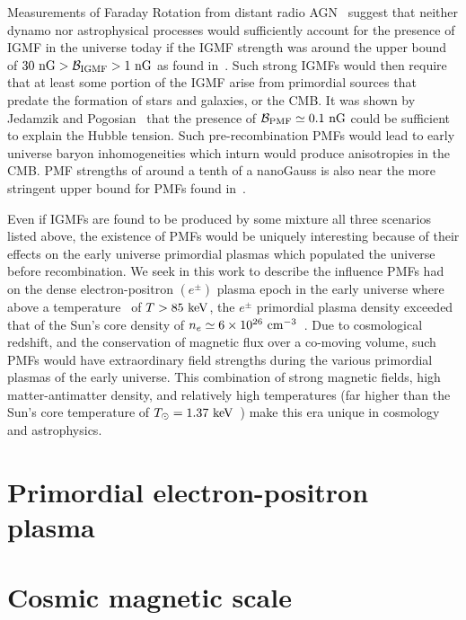 \documentclass[a4paper]{article}
\begin{document}
Measurements of Faraday Rotation from distant radio AGN~\cite{pomakov2022redshift} suggest that neither dynamo nor astrophysical processes would sufficiently account for the presence of IGMF in the universe today if the IGMF strength was around the upper bound of $30{\rm\ nG}>{\cal B}_{\rm IGMF}>1{\rm\ nG}$ as found in~\cite{vernstrom2021discovery}. Such strong IGMFs would then require that at least some portion of the IGMF arise from primordial sources that predate the formation of stars and galaxies, or the CMB. It was shown by Jedamzik and Pogosian~\cite{jedamzik2020relieving} that the presence of ${\cal B}_{\rm PMF}\simeq0.1{\rm\ nG}$ could be sufficient to explain the Hubble tension. Such pre-recombination PMFs would lead to early universe baryon inhomogeneities which inturn would produce anisotropies in the CMB. PMF strengths of around a tenth of a nanoGauss is also near the more stringent upper bound for PMFs found in~\cite{jedamzik2019stringent}.

Even if IGMFs are found to be produced by some mixture all three scenarios listed above, the existence of PMFs would be uniquely interesting because of their effects on the early universe primordial plasmas which populated the universe before recombination. We seek in this work to describe the influence PMFs had on the dense electron-positron $(e^{\pm})$ plasma epoch in the early universe where above a temperature~\cite{rafelski2023short} of $T>85\text{ keV}$, the $e^{\pm}$ primordial plasma density exceeded that of the Sun's core density of $n_{e}\simeq6\times10^{26}{\rm\ cm}^{-3}$~\cite{bahcall2001solar}. Due to cosmological redshift, and the conservation of magnetic flux over a co-moving volume, such PMFs would have extraordinary field strengths during the various primordial plasmas of the early universe. This combination of strong magnetic fields, high matter-antimatter density, and relatively high temperatures (far higher than the Sun's core temperature of $T_{\odot}=1.37\text{ keV}$~\cite{castellani1997solar}) make this era unique in cosmology and astrophysics.

\section{Primordial electron-positron plasma}\label{sec:ElectronPositron}

\section{Cosmic magnetic scale}
\end{document}
